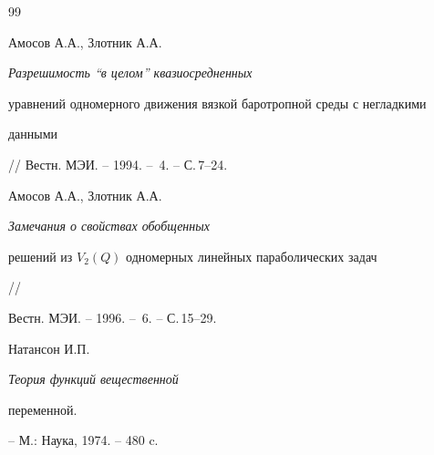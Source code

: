 \documentclass[12pt]{article}
\theoremstyle{plain} %
\theoremstyle{definition}
\numberwithin{equation}{section}
\begin{document}
\begin{thebibliography}{99}


Амосов А.А., Злотник А.А. {\em Разрешимость ``в целом'' квазиосредненных


уравнений одномерного движения вязкой баротропной среды с негладкими


данными} // Вестн. МЭИ. -- 1994. -- \No\,4. -- С.\,7--24.







Амосов А.А., Злотник А.А. {\em Замечания о свойствах обобщенных


решений из $V_2(Q)$ одномерных линейных параболических задач} //


Вестн. МЭИ. -- 1996. -- \No\,6. -- С.\,15--29.







Натансон И.П. {\em Теория функций вещественной


переменной.} -- М.: Наука, 1974. -- 480 c.





\end{thebibliography}





\vskip 1cm







\end{document}
